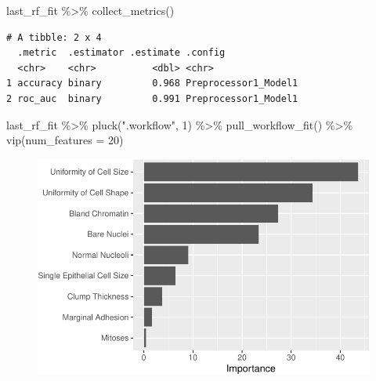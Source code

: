 \documentclass[
  letterpaper,
  DIV=11,
  numbers=noendperiod]{scrreprt}
\newenvironment{Shaded}{\begin{snugshade}}{\end{snugshade}}
\newcommand{\AttributeTok}[1]{\textcolor[rgb]{0.40,0.45,0.13}{#1}}
\newcommand{\DecValTok}[1]{\textcolor[rgb]{0.68,0.00,0.00}{#1}}
\newcommand{\FunctionTok}[1]{\textcolor[rgb]{0.28,0.35,0.67}{#1}}
\newcommand{\NormalTok}[1]{\textcolor[rgb]{0.00,0.23,0.31}{#1}}
\newcommand{\SpecialCharTok}[1]{\textcolor[rgb]{0.37,0.37,0.37}{#1}}
\newcommand{\StringTok}[1]{\textcolor[rgb]{0.13,0.47,0.30}{#1}}
\begin{document}
\begin{Shaded}
\begin{Highlighting}[]
\NormalTok{last\_rf\_fit }\SpecialCharTok{\%\textgreater{}\%} 
  \FunctionTok{collect\_metrics}\NormalTok{()}
\end{Highlighting}
\end{Shaded}

\begin{verbatim}
# A tibble: 2 x 4
  .metric  .estimator .estimate .config             
  <chr>    <chr>          <dbl> <chr>               
1 accuracy binary         0.968 Preprocessor1_Model1
2 roc_auc  binary         0.991 Preprocessor1_Model1
\end{verbatim}

\begin{Shaded}
\begin{Highlighting}[]
\NormalTok{last\_rf\_fit }\SpecialCharTok{\%\textgreater{}\%} 
  \FunctionTok{pluck}\NormalTok{(}\StringTok{".workflow"}\NormalTok{, }\DecValTok{1}\NormalTok{) }\SpecialCharTok{\%\textgreater{}\%}   
  \FunctionTok{pull\_workflow\_fit}\NormalTok{() }\SpecialCharTok{\%\textgreater{}\%} 
  \FunctionTok{vip}\NormalTok{(}\AttributeTok{num\_features =} \DecValTok{20}\NormalTok{)}
\end{Highlighting}
\end{Shaded}

\begin{figure}[H]

{\centering \includegraphics{./14-machine-learning_files/figure-pdf/unnamed-chunk-23-1.pdf}

}

\end{figure}
\end{document}
